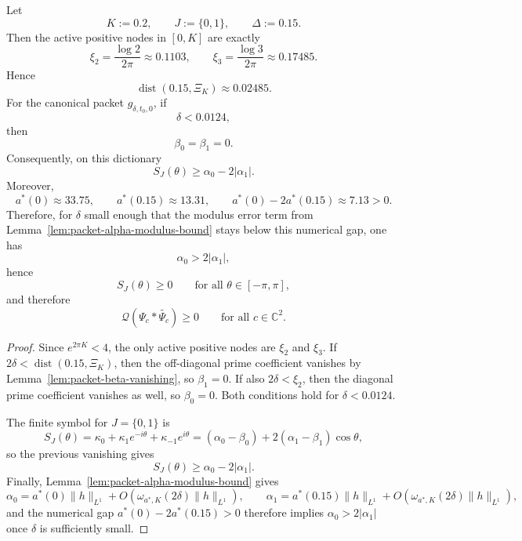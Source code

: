 \begin{proposition}\label{prop:canonical-half-atom-pilot}
Let
\[
  K:=0.2,
  \qquad
  J:=\{0,1\},
  \qquad
  \Delta:=0.15.
\]
Then the active positive nodes in $[0,K]$ are exactly
\[
  \xi_2=\frac{\log 2}{2\pi}\approx 0.1103,
  \qquad
  \xi_3=\frac{\log 3}{2\pi}\approx 0.17485.
\]
Hence
\[
  \operatorname{dist}(0.15,\Xi_K)\approx 0.02485.
\]
For the canonical packet $g_{\delta,t_0,0}$, if
\[
  \delta<0.0124,
\]
then
\[
  \beta_0=\beta_1=0.
\]
Consequently, on this dictionary
\[
  S_J(\theta)\ge \alpha_0-2|\alpha_1|.
\]
Moreover,
\[
  a^*(0)\approx 33.75,
  \qquad
  a^*(0.15)\approx 13.31,
  \qquad
  a^*(0)-2a^*(0.15)\approx 7.13>0.
\]
Therefore, for $\delta$ small enough that the modulus error term from
Lemma~\ref{lem:packet-alpha-modulus-bound} stays below this numerical gap, one
has
\[
  \alpha_0>2|\alpha_1|,
\]
hence
\[
  S_J(\theta)\ge0
  \qquad\text{for all }\theta\in[-\pi,\pi],
\]
and therefore
\[
  \mathcal Q(\Psi_c*\widetilde{\Psi_c})\ge0
  \qquad\text{for all }c\in\mathbb C^2.
\]
\end{proposition}

\begin{proof}
Since $e^{2\pi K}<4$, the only active positive nodes are $\xi_2$ and $\xi_3$.
If $2\delta<\operatorname{dist}(0.15,\Xi_K)$, then the off-diagonal prime
coefficient vanishes by Lemma~\ref{lem:packet-beta-vanishing}, so $\beta_1=0$.
If also $2\delta<\xi_2$, then the diagonal prime coefficient vanishes as well,
so $\beta_0=0$. Both conditions hold for $\delta<0.0124$.

The finite symbol for $J=\{0,1\}$ is
\[
  S_J(\theta)=\kappa_0+\kappa_1 e^{-i\theta}+\kappa_{-1}e^{i\theta}
  =(\alpha_0-\beta_0)+2(\alpha_1-\beta_1)\cos\theta,
\]
so the previous vanishing gives
\[
  S_J(\theta)\ge \alpha_0-2|\alpha_1|.
\]
Finally, Lemma~\ref{lem:packet-alpha-modulus-bound} gives
\[
  \alpha_0=a^*(0)\|h\|_{L^1}+O(\omega_{a^*,K}(2\delta)\|h\|_{L^1}),
  \qquad
  \alpha_1=a^*(0.15)\|h\|_{L^1}+O(\omega_{a^*,K}(2\delta)\|h\|_{L^1}),
\]
and the numerical gap $a^*(0)-2a^*(0.15)>0$ therefore implies
$\alpha_0>2|\alpha_1|$ once $\delta$ is sufficiently small.
\end{proof}

